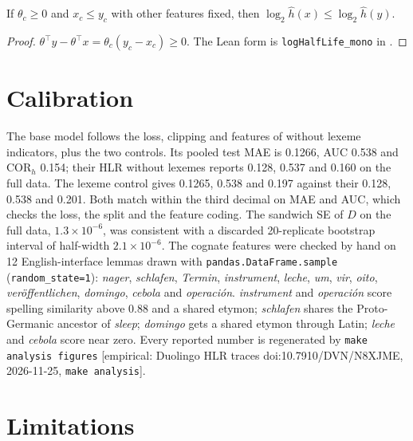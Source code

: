 \documentclass[11pt]{article}
\begin{document}
\begin{lemma}
\label{lem:mono}
If $\theta_c \ge 0$ and $x_c \le y_c$ with other features fixed, then
$\log_2 \hat h(x) \le \log_2 \hat h(y)$.
\end{lemma}

\begin{proof}
$\theta^\top y - \theta^\top x = \theta_c (y_c - x_c) \ge 0$. The Lean
form is \texttt{logHalfLife\_mono} in .
\end{proof}

\section{Calibration}
\label{sec:calibration}

The base model follows the loss, clipping and features of
\autocite{settles2016hlr} without lexeme indicators, plus the two
controls. Its pooled test MAE is 0.1266, AUC 0.538 and COR$_h$ 0.154;
their HLR without lexemes reports 0.128, 0.537 and 0.160 on the full
data. The lexeme control gives 0.1265, 0.538 and 0.197 against their
0.128, 0.538 and 0.201. Both match within the third decimal on MAE and
AUC, which checks the loss, the split and the feature coding. The
sandwich SE of $D$ on the full data, $1.3\times10^{-6}$, was consistent
with a discarded 20-replicate bootstrap interval of half-width
$2.1\times10^{-6}$. The cognate features were checked by hand on 12
English-interface lemmas drawn with \texttt{pandas.DataFrame.sample}
(\texttt{random\_state=1}): \textit{nager}, \textit{schlafen},
\textit{Termin}, \textit{instrument}, \textit{leche}, \textit{um},
\textit{vir}, \textit{oito}, \textit{veröffentlichen}, \textit{domingo},
\textit{cebola} and \textit{operación}. \textit{instrument} and
\textit{operación} score spelling similarity above 0.88 and a shared
etymon; \textit{schlafen} shares the Proto-Germanic ancestor of
\textit{sleep}; \textit{domingo} gets a shared etymon through Latin;
\textit{leche} and \textit{cebola} score near zero. Every reported number
is regenerated by \texttt{make analysis figures} [empirical: Duolingo HLR
traces doi:10.7910/DVN/N8XJME, 2026-11-25, \texttt{make analysis}].

\section{Limitations}
\label{sec:limitations}
\end{document}
